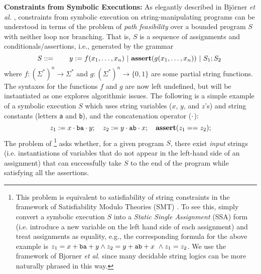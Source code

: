 \smallskip
\noindent
\textbf{Constraints from Symbolic Executions: }
As elegantly described in Bj\"{o}rner \emph{et al.} \cite{BTV09}, constraints 
from symbolic 
execution on string-manipulating programs can be understood in terms of the
problem of \emph{path 
feasibility} over a bounded program $S$ with neither loop nor
branching. %
That is, $S$ is a sequence of assignments and conditionals/assertions, i.e., 
generated by the grammar
\begin{equation}
    S ::= \qquad y := f(x_1,\ldots,x_n) \ |\ \text{\ASSERT{$g(x_1,\ldots,x_n)$}}\ |\ 
            S_1; S_2\ 
            \label{eq:symbex}
\end{equation}
where $f: (\Sigma^*)^n \to \Sigma^*$ and $g: (\Sigma^*)^n \to \{0,1\}$ are
some partial string functions. 
The syntaxes for the functions $f$ and $g$ are now
left undefined, but will be instantiated as one explores algorithmic issues.
The following is a simple example of a symbolic execution $S$
which uses string variables ($x$, $y$, and $z$'s) and string constants
(letters \texttt{a} and \texttt{b}), and the concatenation operator ($\cdot$):
\[
        z_1 := x \cdot \text{\texttt{ba}} \cdot y;\quad 
        z_2 := y \cdot \text{\texttt{ab}} \cdot x;\quad
        \textbf{assert}(z_1 == z_2);
    \]
The problem of \defn{path feasibility}\footnote{
    This problem is equivalent to 
satisfiability of string constraints in the framework of Satisfiability Modulo
Theories (SMT) \cite{SMT-CACM,SMT-chapter,KS08}.
To see this, simply convert a symbolic execution $S$ 
into a \emph{Static Single Assignment} (SSA) form (i.e. introduce a new 
variable 
on the left hand side of each assignment) and treat assignments as equality,
e.g., the corresponding formula for the above example is
        $z_1 = x + \text{\texttt{ba}} + y \wedge
        z_2 = y + \text{\texttt{ab}} + x\ \wedge
        z_1 = z_2$.
We use the framework of Bjorner \emph{et al.} \cite{BTV09} 
since many decidable string logics can be more naturally phrased in this
way.}
asks whether, for a given program $S$, there exist \emph{input} strings (i.e. 
instantiations of variables that do not appear in the left-hand side of an 
assignment) that can successfully take
$S$ to the end of the program while satisfying all the assertions. 


